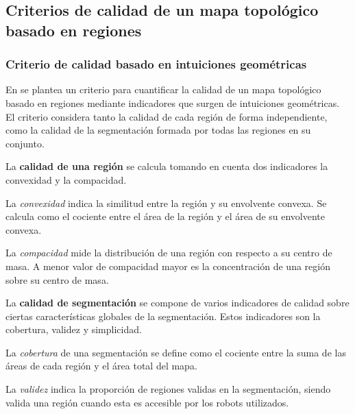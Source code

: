 
\subsection{Criterios de calidad de un mapa topológico basado en regiones}
\subsubsection{Criterio de calidad basado en intuiciones geométricas}
En \cite{Liu2015} se plantea un criterio para cuantificar la calidad de un mapa
topológico basado en regiones mediante indicadores que surgen de intuiciones
geométricas. El criterio considera tanto la calidad de cada región de forma
independiente, como la calidad de la segmentación formada por todas las
regiones en su conjunto.

La \textbf{calidad de una región} se calcula tomando en cuenta dos indicadores
la convexidad y la compacidad. 

La \emph{convexidad} indica la similitud entre la región y su envolvente
convexa. Se calcula como el cociente entre el área de la región y el área de
su envolvente convexa. 

La \emph{compacidad} mide la distribución de una región con respecto
a su centro de masa. A menor valor de compacidad mayor es la concentración de
una región sobre su centro de masa.

La \textbf{calidad de segmentación} se compone de varios indicadores de
calidad sobre ciertas características globales de la segmentación. Estos indicadores son la
cobertura, validez y simplicidad.

La \emph{cobertura} de una segmentación se define como el cociente entre la
suma de las áreas de cada región y el área total del mapa.

La \emph{validez} indica la proporción de regiones validas en la segmentación, siendo valida una
región cuando esta es accesible por los robots utilizados.


